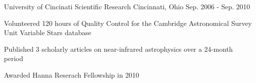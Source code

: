 \begin{cventries}
  \cventry
    {University of Cincinati} %
    {Scientific Research} %
    {Cincinnati, Ohio} %
    {Sep. 2006 - Sep. 2010} %
    {
      \begin{cvitems} %
        \item {Volunteered 120 hours of Quality Control for the Cambridge Astronomical Survey Unit Variable Stars database}
        \item {Published 3 scholarly articles on near-infrared astrophysics over a 24-month period}
        \item {Awarded Hanna Reserach Fellowship in 2010}
      \end{cvitems}
    }

\end{cventries}

